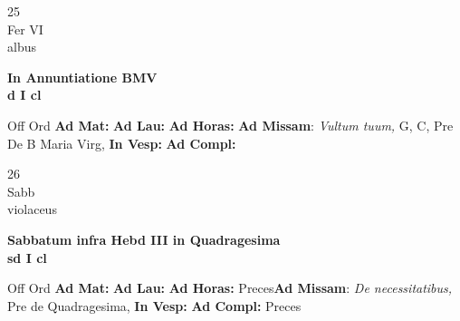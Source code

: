 \documentclass[10pt, openany]{book}
\begin{document}
        \begin{center}
            \begin{minipage}{3.5in}
                \vspace{2em}
                \begin{minipage}{0.5in}
                    {\Huge 25} \\
                    {\normalsize Fer VI} \\
                    {\normalsize albus}
                \end{minipage}
                \begin{minipage}{3.0in}
                    \textbf{ \large In Annuntiatione BMV \\
                    \textnormal{\normalsize d I cl}} \\ 
                \end{minipage}
                \begin{justify}Off Ord
                    \textbf{Ad Mat: }
                    \textbf{Ad Lau: }
                    \textbf{Ad Horas: }\textbf{Ad Missam}: \textit{Vultum tuum,} G, C, Pre De B Maria Virg,  
                    \textbf{In Vesp: }
                    \textbf{Ad Compl: }
                \end{justify}
            \end{minipage}
        \end{center}
    
        \begin{center}
            \begin{minipage}{3.5in}
                \vspace{2em}
                \begin{minipage}{0.5in}
                    {\Huge 26} \\
                    {\normalsize Sabb} \\
                    {\normalsize violaceus}
                \end{minipage}
                \begin{minipage}{3.0in}
                    \textbf{ \large Sabbatum infra Hebd III in Quadragesima \\
                    \textnormal{\normalsize sd I cl}} \\ 
                \end{minipage}
                \begin{justify}Off Ord
                    \textbf{Ad Mat: }
                    \textbf{Ad Lau: }
                    \textbf{Ad Horas: }Preces\textbf{Ad Missam}: \textit{De necessitatibus,} Pre de Quadragesima,  
                    \textbf{In Vesp: }
                    \textbf{Ad Compl: }Preces
                \end{justify}
            \end{minipage}
        \end{center}
    
\end{document}
